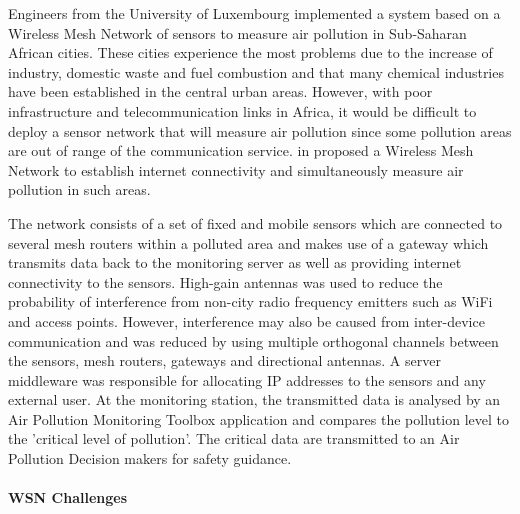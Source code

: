 Engineers from the University of Luxembourg implemented a system based on a Wireless Mesh Network of sensors to measure air pollution in Sub-Saharan African cities. These cities experience the most problems due to the increase of industry, domestic waste and fuel combustion and that many chemical industries have been established in the central urban areas. However, with poor infrastructure and telecommunication links in Africa, it would be difficult to deploy a sensor network that will measure air pollution since some pollution areas are out of range of the communication service.  \citeauthor{fotuewsnpollution} in \cite{fotuewsnpollution} proposed a Wireless Mesh Network to establish internet connectivity and simultaneously measure air pollution in such areas.

The network consists of a set of fixed and mobile sensors which are connected to several mesh routers within a polluted area and makes use of a gateway which transmits data back to the monitoring server as well as providing internet connectivity to the sensors. High-gain antennas was used to reduce the probability of interference from non-city radio frequency emitters such as WiFi and access points. However, interference may also be caused from inter-device communication and was reduced by using multiple orthogonal channels between the sensors, mesh routers, gateways and directional antennas. A server middleware was responsible for allocating IP addresses to the sensors and any external user. At the monitoring station, the transmitted data is analysed by an Air Pollution Monitoring Toolbox application and compares the pollution level to the 'critical level of pollution'. The critical data are transmitted to an Air Pollution Decision makers for safety guidance.

\paragraph{WSN Challenges}


